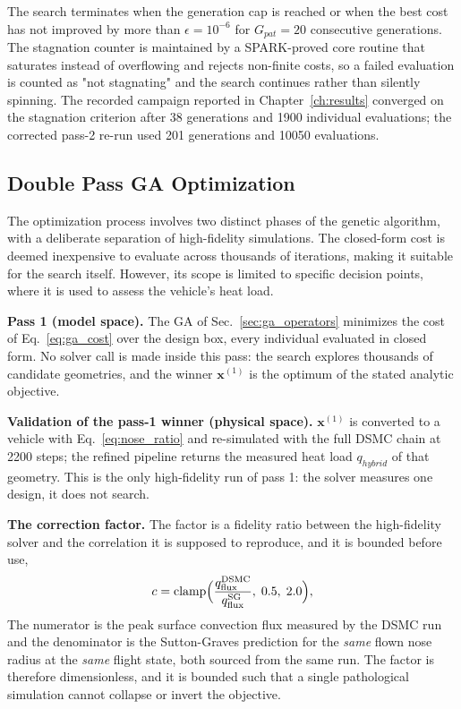 The search terminates when the generation cap is reached or when the best cost has not improved by more than $\epsilon = 10^{-6}$ for $G_{pat} = 20$ consecutive generations. The stagnation counter is maintained by a SPARK-proved core routine that saturates instead of overflowing and rejects non-finite costs, so a failed evaluation is counted as "not stagnating" and the search continues rather than silently spinning. The recorded campaign reported in Chapter~\ref{ch:results} converged on the stagnation criterion after 38 generations and 1900 individual evaluations; the corrected pass-2 re-run used 201 generations and 10050 evaluations.

\subsection{Double Pass GA Optimization}
\label{sec:double_pass_ga}

The optimization process involves two distinct phases of the genetic algorithm, with a deliberate separation of high-fidelity simulations. The closed-form cost is deemed inexpensive to evaluate across thousands of iterations, making it suitable for the search itself. However, its scope is limited to specific decision points, where it is used to assess the vehicle's heat load.

\textbf{Pass 1 (model space).} The GA of Sec.~\ref{sec:ga_operators} minimizes the cost of Eq.~\eqref{eq:ga_cost} over the design box, every individual evaluated in closed form. No solver call is made inside this pass: the search explores thousands of candidate geometries, and the winner $\mathbf{x}^{(1)}$ is the optimum of the stated analytic objective.

\textbf{Validation of the pass-1 winner (physical space).} $\mathbf{x}^{(1)}$ is converted to a vehicle with Eq.~\eqref{eq:nose_ratio} and re-simulated with the full DSMC chain at 2200 steps; the refined pipeline returns the measured heat load $q_{hybrid}$ of that geometry. This is the only high-fidelity run of pass 1: the solver measures one design, it does not search.

\textbf{The correction factor.} The factor is a fidelity ratio between the high-fidelity solver and the correlation it is supposed to reproduce, and it is bounded before use,
\begin{equation}
    c = \operatorname{clamp}\Bigl(\frac{q^{\mathrm{DSMC}}_{\mathrm{flux}}}{q^{\mathrm{SG}}_{\mathrm{flux}}},\;\allowbreak 0.5,\;\allowbreak 2.0\Bigr),
    \label{eq:correction_factor}
\end{equation}
The numerator is the peak surface convection flux measured by the DSMC run and the denominator is the Sutton-Graves prediction for the \emph{same} flown nose radius at the \emph{same} flight state, both sourced from the same run. The factor is therefore dimensionless, and it is bounded such that a single pathological simulation cannot collapse or invert the objective.

